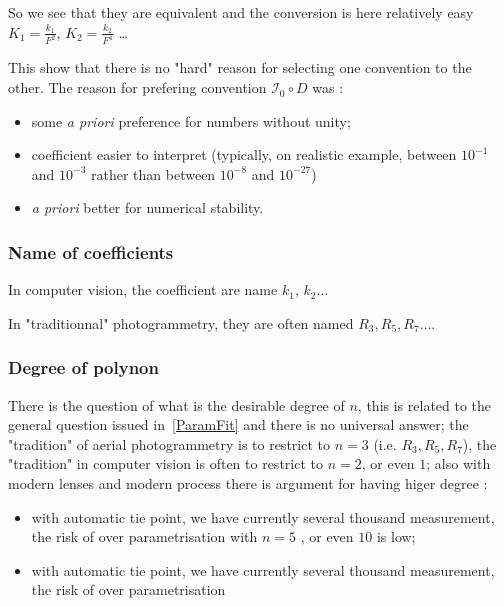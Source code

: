 So we see that they are equivalent and the conversion is here relatively easy  $K_1 = \frac{k_1}{F^2} $,
$K_2 = \frac{k_2}{F^4} $ \dots

This show  that there is no "hard" reason for selecting one convention to the other. The reason for
prefering convention  $\mathcal{I}_0  \circ D$ was :

\begin{itemize}
    \item some \emph{a priori} preference for numbers without unity;

    \item coefficient easier to interpret (typically, on realistic example, between $10^{-1}$ and $10^{-3}$ rather than between $10^{-8}$ and  $10^{-27}$)

    \item \emph{a priori} better for numerical stability.
\end{itemize}


\subsubsection{Name of coefficients}

In computer vision, the coefficient are name $k_1$, $k_2 \dots$ 

In  "traditionnal" photogrammetry, they are often named $R_3,R_5,R_7\dots$.


\subsubsection{Degree of polynon}

There is the question of what is the desirable degree of $n$, this is related to the general question issued in~\ref{ParamFit}
and there is no universal answer;  the "tradition" of aerial photogrammetry is to restrict to $n=3$  (i.e. $R_3,R_5,R_7$),
the "tradition" in computer vision is often to restrict to $n=2$, or even $1$;  also with modern lenses and modern
process there is argument for having higer degree  :
           
\begin{itemize}
         \item   with automatic tie point, we have currently several thousand measurement, the risk of over parametrisation
                 with $n=5$ , or even $10$ is low;

         \item   with automatic tie point, we have currently several thousand measurement, the risk of over parametrisation
\end{itemize}


